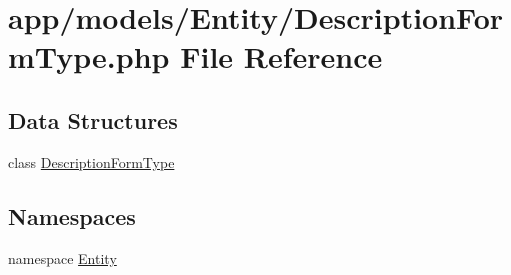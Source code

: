\hypertarget{_description_form_type_8php}{\section{app/models/\-Entity/\-Description\-Form\-Type.php File Reference}
\label{_description_form_type_8php}
}
\subsection*{Data Structures}
\begin{DoxyCompactItemize}
\item 
class \hyperlink{class_entity_1_1_description_form_type}{Description\-Form\-Type}
\end{DoxyCompactItemize}
\subsection*{Namespaces}
\begin{DoxyCompactItemize}
\item 
namespace \hyperlink{namespace_entity}{Entity}
\end{DoxyCompactItemize}
